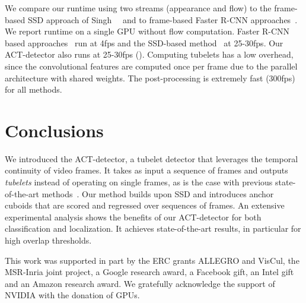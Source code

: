 \documentclass[10pt,twocolumn,letterpaper]{article}
\begin{document}
\vspace{-0.2mm}
We compare our runtime using two streams (appearance and flow) to the frame-based SSD approach of Singh~\etal~\cite{singh16arxiv} and to frame-based Faster R-CNN approaches~\cite{Peng16eccv,Suman16bmvc}. 
We report runtime on a single GPU without flow computation. 
Faster R-CNN based approaches~\cite{Peng16eccv,Suman16bmvc} run at 4fps and the SSD-based method~\cite{singh16arxiv} at 25-30fps.  
Our ACT-detector also runs at 25-30fps (). Computing tubelets has a low overhead, since the convolutional features are computed once per frame due to the parallel architecture with shared weights. 
The post-processing is extremely fast (300fps) for all methods. 








 \section{Conclusions}
\label{sec:conclusions}

We introduced the ACT-detector, a tubelet detector that leverages the temporal continuity of video frames. 
It takes as input a sequence of frames and outputs \textit{tubelets} instead of operating on single frames, as is the case with previous state-of-the-art methods~\cite{Peng16eccv,Suman16bmvc,singh16arxiv}. 
Our method builds upon SSD and introduces anchor cuboids that are scored and regressed over sequences of frames. 
An extensive experimental analysis shows the benefits of our ACT-detector for both classification and localization. 
It achieves state-of-the-art results, in particular for high overlap thresholds.
 

\vspace{0.5mm}
This work was supported in part by the ERC grants ALLEGRO and VisCul, the MSR-Inria joint project, a Google research award, a Facebook gift, an Intel gift and an Amazon research award. We gratefully acknowledge the support of NVIDIA with the donation of GPUs.


{\small


}
\end{document}
